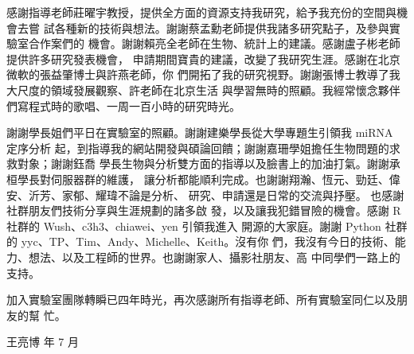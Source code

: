 \begin{acknowledgementszh}

感謝指導老師莊曜宇教授，提供全方面的資源支持我研究，給予我充份的空間與機會去嘗
試各種新的技術與想法。謝謝蔡孟勳老師提供我諸多研究點子，及參與實驗室合作案們的
機會。謝謝賴亮全老師在生物、統計上的建議。感謝盧子彬老師提供許多研究發表機會，
申請期間寶貴的建議，改變了我研究生涯。感謝在北京微軟的張益肇博士與許燕老師，你
們開拓了我的研究視野。謝謝張博士教導了我大尺度的領域發展觀察、許老師在北京生活
與學習無時的照顧。我經常懷念夥伴們寫程式時的歌唱、一周一百小時的研究時光。

謝謝學長姐們平日在實驗室的照顧。謝謝建樂學長從大學專題生引領我 miRNA 定序分析
起，到指導我的網站開發與碩論回饋；謝謝嘉珊學姐擔任生物問題的求救對象；謝謝鈺喬
學長生物與分析雙方面的指導以及臉書上的加油打氣。謝謝承桓學長對伺服器群的維護，
讓分析都能順利完成。也謝謝翔瀚、恆元、勁廷、偉安、沂芳、家郁、耀瑋不論是分析、
研究、申請還是日常的交流與抒壓。 也感謝社群朋友們技術分享與生涯規劃的諸多啟
發，以及讓我犯錯冒險的機會。感謝 R 社群的 Wush、c3h3、chiawei、yen 引領我進入
開源的大家庭。謝謝 Python 社群的 yyc、TP、Tim、Andy、Michelle、Keith。沒有你
們，我沒有今日的技術、能力、想法、以及工程師的世界。也謝謝家人、攝影社朋友、高
中同學們一路上的支持。

加入實驗室團隊轉瞬已四年時光，再次感謝所有指導老師、所有實驗室同仁以及朋友的幫
忙。

\hfill 王亮博 年 7 月
\end{acknowledgementszh}

